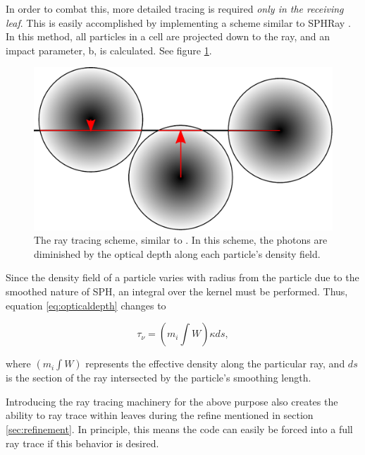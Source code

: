 In order to combat this, more detailed tracing is required \emph{only in the receiving leaf}. This is easily accomplished by implementing a scheme similar to SPHRay \citep{altayEt08}. In this method, all particles in a cell are projected down to the ray, and an impact parameter, b, is calculated. See figure \ref{fig:particletracing}.

\begin{figure}
\includegraphics[width=\textwidth]{graphics/raytrace.eps}
\caption[Ray tracing schemes for receiving cells.]{The ray tracing scheme, similar to \citet{altayEt08}. In this scheme, the photons are diminished by the optical depth along each particle's density field.}
\label{fig:particletracing}
\end{figure}

Since the density field of a particle varies with radius from the particle due to the smoothed nature of SPH, an integral over the kernel must be performed. Thus, equation \ref{eq:opticaldepth} changes to

\begin{equation}
\label{eq:kernelintegral}
\tau_{\nu} = (m_i\int W)\kappa ds,
\end{equation}

where $(m_i\int W)$ represents the effective density along the particular ray, and $ds$ is the section of the ray intersected by the particle's smoothing length.

Introducing the ray tracing machinery for the above purpose also creates the ability to ray trace within leaves during the refine mentioned in section \ref{sec:refinement}. In principle, this means the code can easily be forced into a full ray trace if this behavior is desired.

%

